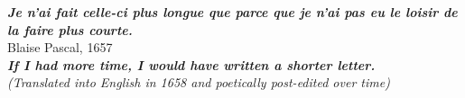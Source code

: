 \thispagestyle{empty}
\hbox{} \vfill
\begin{flushright}
    \small \textit{\textbf{Je n'ai fait celle-ci plus longue que parce que je n'ai pas eu le loisir de la faire plus courte.}}
    \\ \vspace{2.5mm} \small Blaise Pascal, 1657
    \\ \vspace{5mm} \small {\color{gray} \textit{\textbf{If I had more time, I would have written a shorter letter.}}}
    \\ \vspace{2.5mm} \scriptsize {\color{gray} \textit{(Translated into English in 1658 and poetically post-edited over time)}}
\end{flushright}

\clearpage
\thispagestyle{empty}
\cleardoublepage